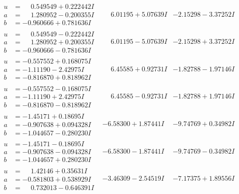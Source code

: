 \documentclass[1p]{elsarticle_modified}
\theoremstyle{definition}
\begin{document}
$$\begin{array}{c|c|c}
\begin{aligned}
u &= \phantom{-}0.549549 + 0.222442 I \\
a &= \phantom{-}1.280952 - 0.200355 I \\
b &= -0.960666 + 0.781636 I\end{aligned}
 & \phantom{-}6.01195 + 5.07639 I & -2.15298 - 3.37252 I \\ \hline\begin{aligned}
u &= \phantom{-}0.549549 - 0.222442 I \\
a &= \phantom{-}1.280952 + 0.200355 I \\
b &= -0.960666 - 0.781636 I\end{aligned}
 & \phantom{-}6.01195 - 5.07639 I & -2.15298 + 3.37252 I \\ \hline\begin{aligned}
u &= -0.557552 + 0.168075 I \\
a &= -1.11190 - 2.42975 I \\
b &= -0.816870 + 0.818962 I\end{aligned}
 & \phantom{-}6.45585 + 0.92731 I & -1.82788 - 1.97146 I \\ \hline\begin{aligned}
u &= -0.557552 - 0.168075 I \\
a &= -1.11190 + 2.42975 I \\
b &= -0.816870 - 0.818962 I\end{aligned}
 & \phantom{-}6.45585 - 0.92731 I & -1.82788 + 1.97146 I \\ \hline\begin{aligned}
u &= -1.45171 + 0.18695 I \\
a &= -0.907638 + 0.094328 I \\
b &= -1.044657 - 0.280230 I\end{aligned}
 & -6.58300 + 1.87441 I & -9.74769 + 0.34982 I \\ \hline\begin{aligned}
u &= -1.45171 - 0.18695 I \\
a &= -0.907638 - 0.094328 I \\
b &= -1.044657 + 0.280230 I\end{aligned}
 & -6.58300 - 1.87441 I & -9.74769 - 0.34982 I \\ \hline\begin{aligned}
u &= \phantom{-}1.42146 + 0.35631 I \\
a &= -0.581803 + 0.538929 I \\
b &= \phantom{-}0.732013 - 0.646391 I\end{aligned}
 & -3.46309 - 2.54519 I & -7.17375 + 1.89556 I \\ \hline\begin{aligned}

\end{aligned}
\end{array}$$
\end{document}

